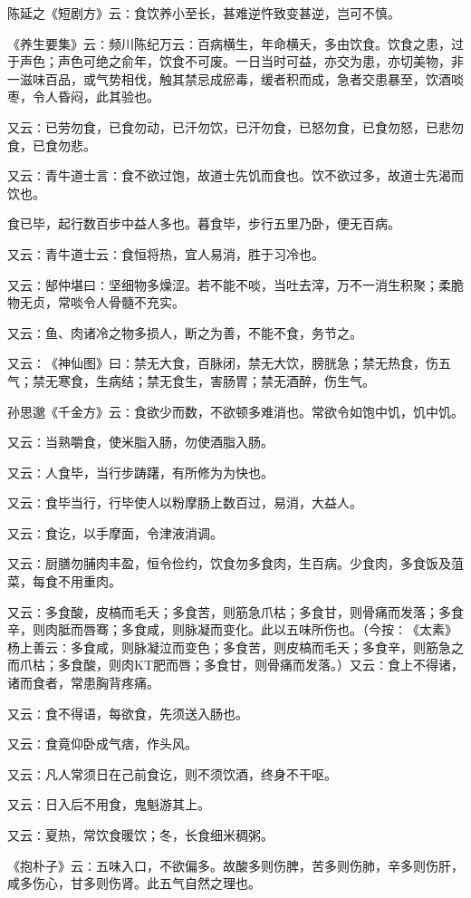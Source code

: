 \documentclass[a4paper,12pt,UTF8,twoside]{ctexbook}
\begin{document}
陈延之《短剧方》云∶食饮养小至长，甚难逆忤致变甚逆，岂可不慎。

《养生要集》云∶频川陈纪万云∶百病横生，年命横夭，多由饮食。饮食之患，过于声色；声色可绝之俞年，饮食不可废。一日当时可益，亦交为患，亦切美物，非一滋味百品，或气势相伐，触其禁忌成瘀毒，缓者积而成，急者交患暴至，饮酒啖枣，令人昏闷，此其验也。

又云∶已劳勿食，已食勿动，已汗勿饮，已汗勿食，已怒勿食，已食勿怒，已悲勿食，已食勿悲。

又云∶青牛道士言∶食不欲过饱，故道士先饥而食也。饮不欲过多，故道士先渴而饮也。

食已毕，起行数百步中益人多也。暮食毕，步行五里乃卧，便无百病。

又云∶青牛道士云∶食恒将热，宜人易消，胜于习冷也。

又云∶郜仲堪曰∶坚细物多燥涩。若不能不啖，当吐去滓，万不一消生积聚；柔脆物无贞，常啖令人骨髓不充实。

又云∶鱼、肉诸冷之物多损人，断之为善，不能不食，务节之。

又云∶《神仙图》曰∶禁无大食，百脉闭，禁无大饮，膀胱急；禁无热食，伤五气；禁无寒食，生病结；禁无食生，害肠胃；禁无酒醉，伤生气。

孙思邈《千金方》云∶食欲少而数，不欲顿多难消也。常欲令如饱中饥，饥中饥。

又云∶当熟嚼食，使米脂入肠，勿使酒脂入肠。

又云∶人食毕，当行步踌躇，有所修为为快也。

又云∶食毕当行，行毕使人以粉摩肠上数百过，易消，大益人。

又云∶食讫，以手摩面，令津液消调。

又云∶厨膳勿脯肉丰盈，恒令俭约，饮食勿多食肉，生百病。少食肉，多食饭及菹菜，每食不用重肉。

又云∶多食酸，皮槁而毛夭；多食苦，则筋急爪枯；多食甘，则骨痛而发落；多食辛，则肉胝而唇骞；多食咸，则脉凝而变化。此以五味所伤也。（今按∶《太素》杨上善云∶多食咸，则脉凝泣而变色；多食苦，则皮槁而毛夭；多食辛，则筋急之而爪枯；多食酸，则肉KT肥而唇；多食甘，则骨痛而发落。）又云∶食上不得诸，诸而食者，常患胸背疼痛。

又云∶食不得语，每欲食，先须送入肠也。

又云∶食竟仰卧成气痞，作头风。

又云∶凡人常须日在己前食讫，则不须饮酒，终身不干呕。

又云∶日入后不用食，鬼魁游其上。

又云∶夏热，常饮食暖饮；冬，长食细米稠粥。

《抱朴子》云∶五味入口，不欲偏多。故酸多则伤脾，苦多则伤肺，辛多则伤肝，咸多伤心，甘多则伤肾。此五气自然之理也。
\end{document}
